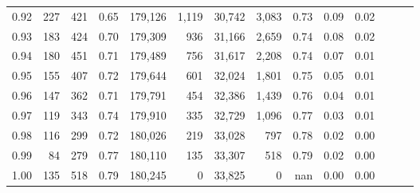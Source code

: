 \begin{tabular}{rrrrrrrrrrrrrr}
0.92 &    227 &  421 &  0.65 &  179,126 &    1,119 &  30,742 &   3,083 &  0.73 &  0.09 &      0.02 \\
0.93 &    183 &  424 &  0.70 &  179,309 &      936 &  31,166 &   2,659 &  0.74 &  0.08 &      0.02 \\
0.94 &    180 &  451 &  0.71 &  179,489 &      756 &  31,617 &   2,208 &  0.74 &  0.07 &      0.01 \\
0.95 &    155 &  407 &  0.72 &  179,644 &      601 &  32,024 &   1,801 &  0.75 &  0.05 &      0.01 \\
0.96 &    147 &  362 &  0.71 &  179,791 &      454 &  32,386 &   1,439 &  0.76 &  0.04 &      0.01 \\
0.97 &    119 &  343 &  0.74 &  179,910 &      335 &  32,729 &   1,096 &  0.77 &  0.03 &      0.01 \\
0.98 &    116 &  299 &  0.72 &  180,026 &      219 &  33,028 &     797 &  0.78 &  0.02 &      0.00 \\
0.99 &     84 &  279 &  0.77 &  180,110 &      135 &  33,307 &     518 &  0.79 &  0.02 &      0.00 \\
1.00 &    135 &  518 &  0.79 &  180,245 &        0 &  33,825 &       0 &   nan &  0.00 &      0.00 \\
\bottomrule
\end{tabular}
